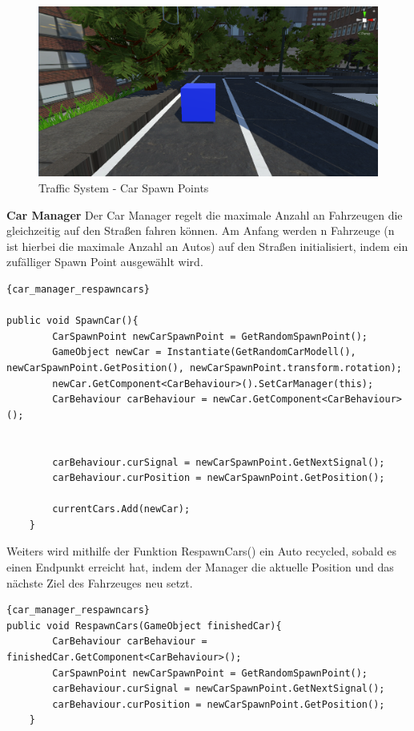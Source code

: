 \begin{figure}
    \centering
    \includegraphics[scale=0.4]{pics/trafficsystem_respawn_point}
    \caption{Traffic System - Car Spawn Points}
    \label{fig:trafficsystem_car_spawn_points}
\end{figure}


\textbf{Car Manager}
Der Car Manager regelt die maximale Anzahl an Fahrzeugen die gleichzeitig auf den Straßen fahren k\"onnen.
Am Anfang werden n Fahrzeuge (n ist hierbei die maximale Anzahl an Autos) auf den Straßen initialisiert, indem ein zuf\"alliger Spawn Point ausgewählt wird.
\begin{lstlisting}{car_manager_respawncars}

public void SpawnCar(){
        CarSpawnPoint newCarSpawnPoint = GetRandomSpawnPoint();
        GameObject newCar = Instantiate(GetRandomCarModell(), newCarSpawnPoint.GetPosition(), newCarSpawnPoint.transform.rotation);
        newCar.GetComponent<CarBehaviour>().SetCarManager(this);
        CarBehaviour carBehaviour = newCar.GetComponent<CarBehaviour>();


        carBehaviour.curSignal = newCarSpawnPoint.GetNextSignal();
        carBehaviour.curPosition = newCarSpawnPoint.GetPosition();

        currentCars.Add(newCar);
    }
\end{lstlisting}

Weiters wird mithilfe der Funktion RespawnCars() ein Auto recycled, sobald es einen Endpunkt erreicht hat, indem der Manager die aktuelle Position und das n\"achste Ziel des Fahrzeuges neu setzt.
\begin{lstlisting}{car_manager_respawncars}
public void RespawnCars(GameObject finishedCar){
        CarBehaviour carBehaviour = finishedCar.GetComponent<CarBehaviour>();
        CarSpawnPoint newCarSpawnPoint = GetRandomSpawnPoint();
        carBehaviour.curSignal = newCarSpawnPoint.GetNextSignal();
        carBehaviour.curPosition = newCarSpawnPoint.GetPosition();
    }
\end{lstlisting}

